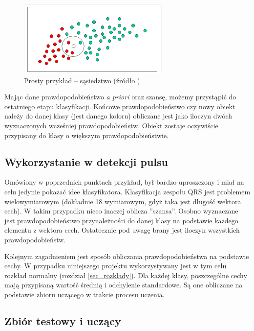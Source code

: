 \begin{figure}[!htb]
  \begin{center}
    \includegraphics[scale = 1]
    {img/bayes_przyklad_2.png}
  \end{center}
  \caption{Prosty przykład -- sąsiedztwo (źródło \cite{bibPodrecznik})}
  \label{fig_bayes_przyklad2}
\end{figure}

Mając dane prawdopodobieństwo \textit{a priori} oraz szansę, możemy przystąpić do ostatniego etapu klasyfikacji. Końcowe prawdopodobieństwo czy nowy obiekt należy do danej klasy (jest danego koloru) obliczane jest jako iloczyn dwóch wyznaczonych wcześniej prawdopodobieństw. Obiekt zostaje oczywiście przypisany do klasy o większym prawdopodobieństwie.


\subsection{Wykorzystanie w detekcji pulsu}
\label{subsec_bayes_detekcja_pulsu}

Omówiony w poprzednich punktach przykład, był bardzo uproszczony i miał na celu jedynie pokazać idee klasyfikatora. Klasyfikacja zespołu QRS jest problemem wielowymiarowym (dokładnie 18 wymiarowym, gdyż taka jest długość wektora cech). W takim przypadku nieco inaczej oblicza ''szansa''. Osobno wyznaczane jest prawdopodobieństwo przynależności do danej klasy na podstawie każdego elementu z wektora cech. Ostatecznie pod uwagę brany jest iloczyn wszystkich prawdopodobieństw.

Kolejnym zagadnieniem jest sposób obliczania prawdopodobieństwa na podstawie cechy. W przypadku niniejszego projektu wykorzystywany jest w tym celu rozkład normalny (rozdział \ref{sec_rozklady}). Dla każdej klasy, poszczególne cechy mają przypisaną wartość średnią i odchylenie standardowe. Są one obliczane na podstawie zbioru uczącego w trakcie procesu uczenia.

\subsection{Zbiór testowy i uczący}
\label{subsec_test_ucz}

